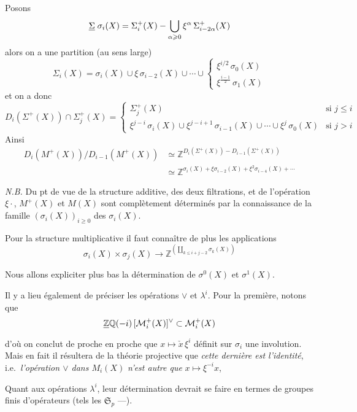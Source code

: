 \documentclass[11pt,a4paper]{article}
\begin{document}
Posons
\[
  \struck{\Sigma}\; \sigma_{i}(X) = \Sigma^{+}_{i}(X) - \bigcup_{\alpha \geqslant 0} \xi^{\alpha}\, \Sigma^{+}_{i-2\alpha}(X)
\]
alors on a une partition (au sens large)
\[
  \Sigma_{i}(X) = \sigma_{i}(X) \cup \xi\, \sigma_{i-2}(X) \cup \cdots \cup
  \left\{
  \begin{array}{l}
    \xi^{i/2}\, \sigma_{0}(X) \\
    \xi^{\frac{i-1}{2}}\, \sigma_{1}(X)
  \end{array}
  \right.
\]
et on a donc
\[
  D_{i}(\Sigma^{+}(X)) \cap \Sigma^{+}_{j}(X) =
  \begin{cases}
    \Sigma^{+}_{j}(X) & \text{si } j \leqslant i \\
    \xi^{j-i}\, \sigma_{i}(X) \cup \xi^{j-i+1}\, \sigma_{i-1}(X) \cup \cdots \cup \xi^{j}\, \sigma_{0}(X) & \text{si } j > i
  \end{cases}
\]
Ainsi
\[
  \begin{aligned}
    D_{i}(M^{+}(X)) / D_{i-1}(M^{+}(X)) &\simeq \mathbb{Z}^{D_{i}(\Sigma^{+}(X)) - D_{i-1}(\Sigma^{+}(X))} \\
    &\simeq \mathbb{Z}^{\sigma_{i}(X) + \xi \sigma_{i-2}(X) + \xi^{2} \sigma_{i-4}(X) + \cdots}
  \end{aligned}
\]

\emph{N.B.} Du pt de vue de la structure additive, des deux
filtrations, et de l'opération $\xi \cdot$, $M^{+}(X)$ et $M(X)$ sont
complètement déterminés par la connaissance de la famille
$(\sigma_{i}(X))_{i \geqslant 0}$ des  $\sigma_{i}(X)$.

Pour la structure multiplicative il faut connaître de plus les applications
\[
  \sigma_{i}(X) \times \sigma_{j}(X) \longrightarrow
  \mathbb{Z}^{\left(\coprod_{k \leqslant i+j-2} \sigma_{k}(X)\right)}
\]

Nous allons expliciter plus bas la détermination de $\sigma^{0}(X)$ et
$\sigma^{1}(X)$.

Il y a lieu également de préciser les opérations $\vee$ et $\lambda^{i}$. Pour
la première, notons que
\[
  \struck{\mathbb{Z}}\mathbb{Q}(-i)\, [\mathcal{M}^{+}_{i}(X)]^{\vee} \subset \mathcal{M}^{+}_{i}(X)
\]
d'où on conclut de proche en proche que $x \mapsto \check{x}\, \xi^{i}$ définit
sur $\sigma_{i}$ une involution. Mais en fait il résultera de la théorie
projective que
\emph{cette dernière est l'identité}, i.e.\ \emph{l'opération $\vee$ dans
$M_{i}(X)$} \struck{\ill{}} \emph{n'est autre que} $x \mapsto \xi^{-i} x$,
\struck{\ill{}}

Quant aux opérations $\lambda^{i}$, leur détermination devrait se faire en
termes de groupes finis d'opérateurs (tels les $\mathfrak{S}_{p}$ —).
\end{document}
